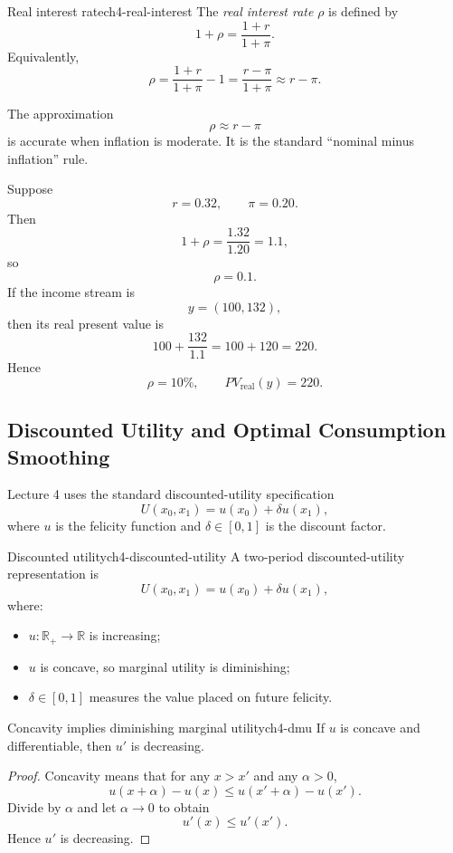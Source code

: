 \begin{definition}{Real interest rate}{ch4-real-interest}
The \emph{real interest rate} $\rho$ is defined by
\[
1+\rho = \frac{1+r}{1+\pi}.
\]
Equivalently,
\[
\rho = \frac{1+r}{1+\pi}-1 = \frac{r-\pi}{1+\pi} \approx r-\pi.
\]
\end{definition}

The approximation
\[
\rho \approx r-\pi
\]
is accurate when inflation is moderate. It is the standard ``nominal minus inflation'' rule.

\begin{examplebox}[title={Worked Example: computing the real interest rate}]
Suppose
\[
r=0.32, \qquad \pi=0.20.
\]
Then
\[
1+\rho = \frac{1.32}{1.20}=1.1,
\]
so
\[
\rho = 0.1.
\]
If the income stream is
\[
y=(100,132),
\]
then its real present value is
\[
100+\frac{132}{1.1}=100+120=220.
\]
Hence
\[
\boxed{\rho=10\%, \qquad PV_{\text{real}}(y)=220.}
\]
\end{examplebox}

\subsection{Discounted Utility and Optimal Consumption Smoothing}

Lecture 4 uses the standard discounted-utility specification
\[
U(x_0,x_1)=u(x_0)+\delta u(x_1),
\]
where $u$ is the felicity function and $\delta \in [0,1]$ is the discount factor.

\begin{definition}{Discounted utility}{ch4-discounted-utility}
A two-period discounted-utility representation is
\[
U(x_0,x_1)=u(x_0)+\delta u(x_1),
\]
where:
\begin{itemize}
    \item $u:\mathbb{R}_+\to \mathbb{R}$ is increasing;
    \item $u$ is concave, so marginal utility is diminishing;
    \item $\delta \in [0,1]$ measures the value placed on future felicity.
\end{itemize}
\end{definition}

\begin{theorem}{Concavity implies diminishing marginal utility}{ch4-dmu}
If $u$ is concave and differentiable, then $u'$ is decreasing.
\end{theorem}

\begin{proof}
Concavity means that for any $x>x'$ and any $\alpha>0$,
\[
u(x+\alpha)-u(x) \le u(x'+\alpha)-u(x').
\]
Divide by $\alpha$ and let $\alpha \to 0$ to obtain
\[
u'(x) \le u'(x').
\]
Hence $u'$ is decreasing.
\end{proof}

